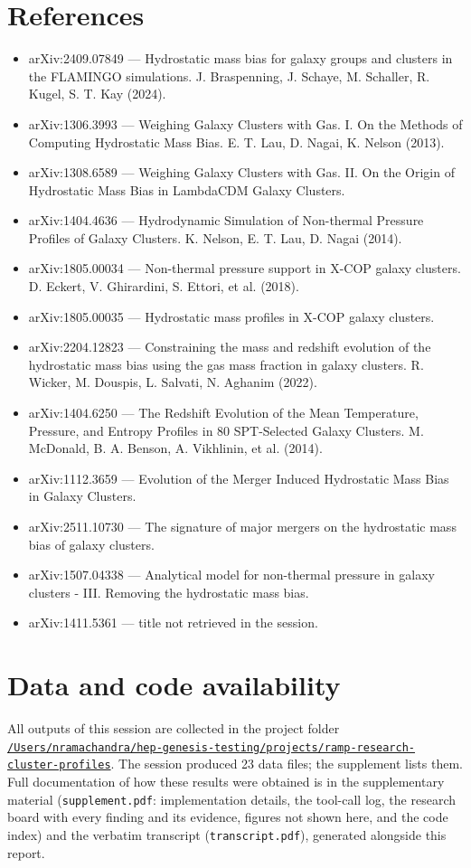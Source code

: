 \documentclass[11pt,a4paper]{article}
\begin{document}
\section*{References}
\begin{itemize}
\item arXiv:2409.07849 --- Hydrostatic mass bias for galaxy groups and clusters in the FLAMINGO simulations. J. Braspenning, J. Schaye, M. Schaller, R. Kugel, S. T. Kay (2024).
\item arXiv:1306.3993 --- Weighing Galaxy Clusters with Gas. I. On the Methods of Computing Hydrostatic Mass Bias. E. T. Lau, D. Nagai, K. Nelson (2013).
\item arXiv:1308.6589 --- Weighing Galaxy Clusters with Gas. II. On the Origin of Hydrostatic Mass Bias in LambdaCDM Galaxy Clusters.
\item arXiv:1404.4636 --- Hydrodynamic Simulation of Non-thermal Pressure Profiles of Galaxy Clusters. K. Nelson, E. T. Lau, D. Nagai (2014).
\item arXiv:1805.00034 --- Non-thermal pressure support in X-COP galaxy clusters. D. Eckert, V. Ghirardini, S. Ettori, et al. (2018).
\item arXiv:1805.00035 --- Hydrostatic mass profiles in X-COP galaxy clusters.
\item arXiv:2204.12823 --- Constraining the mass and redshift evolution of the hydrostatic mass bias using the gas mass fraction in galaxy clusters. R. Wicker, M. Douspis, L. Salvati, N. Aghanim (2022).
\item arXiv:1404.6250 --- The Redshift Evolution of the Mean Temperature, Pressure, and Entropy Profiles in 80 SPT-Selected Galaxy Clusters. M. McDonald, B. A. Benson, A. Vikhlinin, et al. (2014).
\item arXiv:1112.3659 --- Evolution of the Merger Induced Hydrostatic Mass Bias in Galaxy Clusters.
\item arXiv:2511.10730 --- The signature of major mergers on the hydrostatic mass bias of galaxy clusters.
\item arXiv:1507.04338 --- Analytical model for non-thermal pressure in galaxy clusters - III. Removing the hydrostatic mass bias.
\item arXiv:1411.5361 --- title not retrieved in the session.
\end{itemize}

\section*{Data and code availability}
All outputs of this session are collected in the project folder \href{file:///Users/nramachandra/hep-genesis-testing/projects/ramp-research-cluster-profiles}{\texttt{/\allowbreak{}Users/\allowbreak{}nramachandra/\allowbreak{}hep-genesis-testing/\allowbreak{}projects/\allowbreak{}ramp-research-cluster-profiles}}.
The session produced 23 data files; the supplement lists them.
Full documentation of how these results were obtained is in the supplementary material (\texttt{supplement.pdf}: implementation details, the tool-call log, the research board with every finding and its evidence, figures not shown here, and the code index) and the verbatim transcript (\texttt{transcript.pdf}), generated alongside this report.
\end{document}

